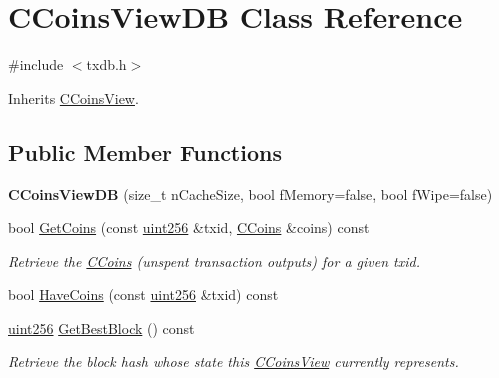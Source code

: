 \hypertarget{class_c_coins_view_d_b}{}\section{C\+Coins\+View\+DB Class Reference}
\label{class_c_coins_view_d_b}


{\ttfamily \#include $<$txdb.\+h$>$}



Inherits \mbox{\hyperlink{class_c_coins_view}{C\+Coins\+View}}.

\subsection*{Public Member Functions}
\begin{DoxyCompactItemize}
\item 
\mbox{\label{class_c_coins_view_d_b_a209841b241febcccb2ec584b886ad374}} 
{\bfseries C\+Coins\+View\+DB} (size\+\_\+t n\+Cache\+Size, bool f\+Memory=false, bool f\+Wipe=false)
\item 
\mbox{\label{class_c_coins_view_d_b_ac35a80d1115ec697101d382e71db5b31}} 
bool \mbox{\hyperlink{class_c_coins_view_d_b_ac35a80d1115ec697101d382e71db5b31}{Get\+Coins}} (const \mbox{\hyperlink{classuint256}{uint256}} \&txid, \mbox{\hyperlink{class_c_coins}{C\+Coins}} \&coins) const
\begin{DoxyCompactList}\small\item\em Retrieve the \mbox{\hyperlink{class_c_coins}{C\+Coins}} (unspent transaction outputs) for a given txid. \end{DoxyCompactList}\item 
bool \mbox{\hyperlink{class_c_coins_view_d_b_af55f35faadeb74b5406559fe3ed20114}{Have\+Coins}} (const \mbox{\hyperlink{classuint256}{uint256}} \&txid) const
\item 
\mbox{\label{class_c_coins_view_d_b_ac9c513a34b9e58d942fdbeafd9e5bbce}} 
\mbox{\hyperlink{classuint256}{uint256}} \mbox{\hyperlink{class_c_coins_view_d_b_ac9c513a34b9e58d942fdbeafd9e5bbce}{Get\+Best\+Block}} () const
\begin{DoxyCompactList}\small\item\em Retrieve the block hash whose state this \mbox{\hyperlink{class_c_coins_view}{C\+Coins\+View}} currently represents. \end{DoxyCompactList}\item 

\end{DoxyCompactItemize}
